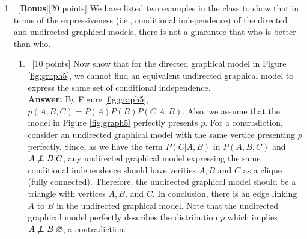 \documentclass[12pt, fullpage,letterpaper]{article}
\def\red{\color{black!30!red}}
\def\blackblue{\color{black!40!blue}}
\newcommand\independent{\protect\mathpalette{\protect\independenT}{\perp}}
\def\independenT#1#2{\mathrel{\rlap{$#1#2$}\mkern2mu{#1#2}}}
\begin{document}
\begin{enumerate}
\item~[\textbf{Bonus}][20 points] We have listed two examples in the class to show that in terms of the expressiveness (i.e., conditional independence) of the directed and undirected graphical models, there is not a guarantee that who is better than who. 
\begin{enumerate}
	\item~[10 points] Now show that for the directed graphical model in Figure \ref{fig:graph5}, we cannot find an equivalent undirected graphical model to express the same set of conditional independence. \\
{\bf \red Answer: }{\blackblue 
By Figure \ref{fig:graph5},  $p(A,B,C)= P(A)P(B)P(C|A,B)$. Also, we assume that the model in Figure \ref{fig:graph5} perfectly presents $p$. 
For a contradiction, consider an undirected graphical model with the same vertice presenting $p$ perfectly. 
Since, as we have the term $P(C|A, B)$ in $P(A, B, C)$ and $A \not\independent B|C$,  any undirected graphical model expressing the same conditional independence should have verities $A, B$ and $C$ as a clique (fully connected). Therefore, the undirected graphical model should be a triangle with vertices $A, B$, and $C$. In conclusion, there is an edge linking $A$ to $B$ in the undirected graphical model. Note that the undirected graphical model perfectly describes the distribution $p$ which implies $A \not\independent B|\varnothing$, a contradiction. }	
	

\end{enumerate}
\end{enumerate}
\end{document}
